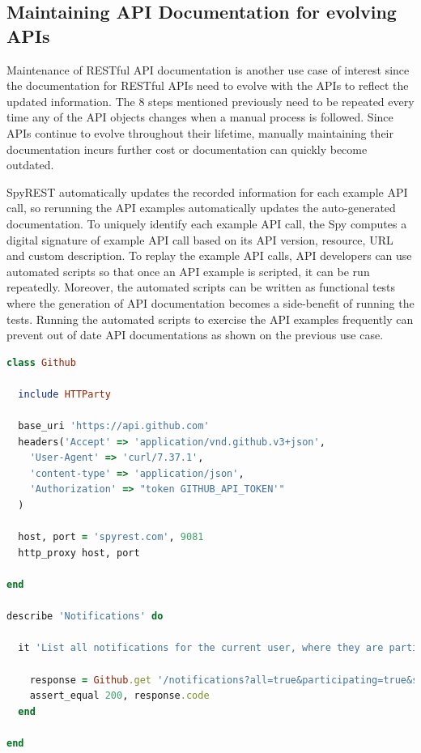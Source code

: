 \documentclass[conference]{IEEEtran}
\begin{document}
\subsection{Maintaining API Documentation for evolving APIs} %
Maintenance of RESTful API documentation is another use case of interest since the documentation for RESTful APIs need to evolve with the APIs to reflect the updated information. The 8 steps mentioned previously need to be repeated every time any of the API objects changes when a manual process is followed. Since APIs continue to evolve throughout their lifetime, manually maintaining their documentation incurs further cost or documentation can quickly become outdated.

SpyREST automatically updates the recorded information for each example API call, so rerunning the API examples automatically updates the auto-generated documentation. To uniquely identify each example API call, the Spy computes a digital signature of example API call based on its API version, resource, URL and custom description. To replay the example API calls, API developers can use automated scripts so that once an API example is scripted, it can be run repeatedly. Moreover, the automated scripts can be written as functional tests where the generation of API documentation becomes a side-benefit of running the tests. Running the automated scripts to exercise the API examples frequently can prevent out of date API documentations as shown on the previous use case.

\begin{lstlisting}[language=ruby, breaklines=true, caption={}, label=list:ex, float,floatplacement=H, caption=Example API call using SpyREST, label={lst:notifications}]
class Github

  include HTTParty

  base_uri 'https://api.github.com'
  headers('Accept' => 'application/vnd.github.v3+json',
    'User-Agent' => 'curl/7.37.1',
    'content-type' => 'application/json',
    'Authorization' => "token GITHUB_API_TOKEN'"
  )

  host, port = 'spyrest.com', 9081
  http_proxy host, port

end

describe 'Notifications' do

  it 'List all notifications for the current user, where they are participating, since a time' do

    response = Github.get '/notifications?all=true&participating=true&since=2014-01-01T00:00:00Z'
    assert_equal 200, response.code
  end

end\end{lstlisting}
\end{document}
